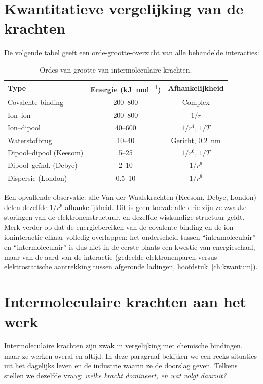 \section{Kwantitatieve vergelijking van de krachten}

De volgende tabel geeft een orde-grootte-overzicht van alle behandelde interacties:

\begin{table}[h]
\centering
\begin{tabular}{lcc}
\toprule
Type & Energie (\si{\kilo\joule\per\mole}) & Afhankelijkheid \\
\midrule
Covalente binding & 200--800 & Complex \\
Ion--ion & 200--800 & $1/r$ \\
Ion--dipool & 40--600 & $1/r^4$, $1/T$ \\
Waterstofbrug & 10--40 & Gericht, \SI{0.2}{\nano\metre} \\
Dipool--dipool (Keesom) & 5--25 & $1/r^6$, $1/T$ \\
Dipool--ge\"ind. (Debye) & 2--10 & $1/r^6$ \\
Dispersie (London) & 0.5--10 & $1/r^6$ \\
\bottomrule
\end{tabular}
\caption{Ordes van grootte van intermoleculaire krachten.}
\end{table}

Een opvallende observatie: alle Van der Waalskrachten (Keesom, Debye, London) delen dezelfde $1/r^6$-afhankelijkheid. Dit is geen toeval: alle drie zijn ze zwakke storingen van de elektronenstructuur, en dezelfde wiskundige structuur geldt. Merk verder op dat de energiebereiken van de covalente binding en de ion--ioninteractie elkaar volledig overlappen: het onderscheid tussen ``intramoleculair'' en ``intermoleculair'' is dus niet in de eerste plaats een kwestie van energieschaal, maar van de aard van de interactie (gedeelde elektronenparen versus elektrostatische aantrekking tussen afgeronde ladingen, hoofdstuk~\ref{ch:kwantum}).

\section{Intermoleculaire krachten aan het werk}
\label{sec:im-toepassingen}

Intermoleculaire krachten zijn zwak in vergelijking met chemische bindingen, maar ze werken overal en altijd. In deze paragraaf bekijken we een reeks situaties uit het dagelijks leven en de industrie waarin ze de doorslag geven. Telkens stellen we dezelfde vraag: \emph{welke kracht domineert, en wat volgt daaruit?}

